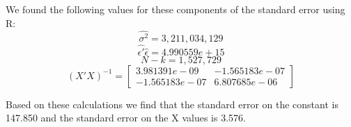 \documentclass{article}
\begin{document}
We found the following values for these components of the standard error using R:
\\
\begin{equation}
\hat{\sigma^2}=3,211,034,129
\end{equation}
\begin{equation}
\hat{\epsilon'}\hat{\epsilon}=4.990559e+15
\end{equation}
\begin{equation}
N-k=1,527,729
\end{equation}
\begin{equation}
(X'X)^{-1}=
\begin{bmatrix}

3.981391e-09 & -1.565183e-07 \\
-1.565183e-07 & 6.807685e-06
\end{bmatrix}

\end{equation}

Based on these calculations we find that the standard error on the constant is 147.850 and the standard error on the X values is 3.576.
\end{document}
